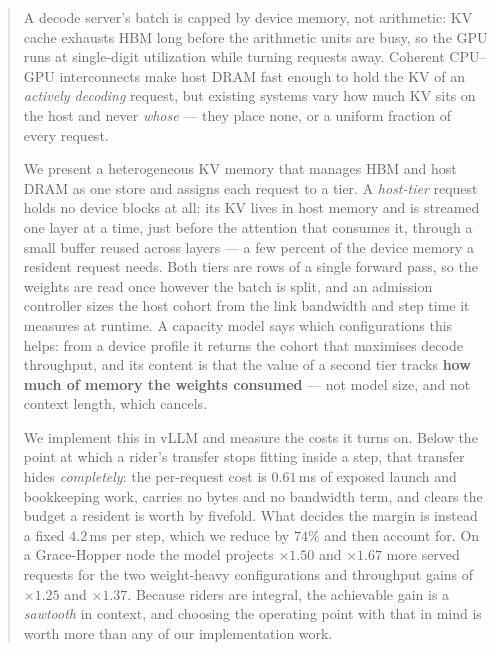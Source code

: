 \begin{abstract}
A decode server's batch is capped by device memory, not arithmetic: KV cache
exhausts HBM long before the arithmetic units are busy, so the GPU runs at
single-digit utilization while turning requests away. Coherent CPU--GPU
interconnects make host DRAM fast enough to hold the KV of an \emph{actively
decoding} request, but existing systems vary how much KV sits on the host and
never \emph{whose} --- they place none, or a uniform fraction of every request.

We present a heterogeneous KV memory that manages HBM and host DRAM as one store
and assigns each request to a tier. A \emph{host-tier} request holds no device
blocks at all: its KV lives in host memory and is streamed one layer at a time,
just before the attention that consumes it, through a small buffer reused across
layers --- a few percent of the device memory a resident request needs. Both tiers
are rows of a single forward pass, so the weights are read once however the batch
is split, and an admission controller sizes the host cohort from the link
bandwidth and step time it measures at runtime. A capacity model says which
configurations this helps: from a device profile it returns the cohort that
maximises decode throughput, and its content is that the value of a second tier
tracks \textbf{how much of memory the weights consumed} --- not model size, and
not context length, which cancels.

We implement this in vLLM and measure the costs it turns on. Below the point at
which a rider's transfer stops fitting inside a step, that transfer hides
\emph{completely}: the per-request cost is $0.61$\,ms of exposed launch and
bookkeeping work, carries no bytes and no bandwidth term, and clears the budget a
resident is worth by fivefold. What decides the margin is instead a fixed
$4.2$\,ms per step, which we reduce by $74\%$ and then account for. On a
Grace-Hopper node the model projects $\times1.50$ and $\times1.67$ more served
requests for the two weight-heavy configurations and throughput gains of
$\times1.25$ and $\times1.37$. Because riders are integral, the achievable gain is
a \emph{sawtooth} in context, and choosing the operating point with that in mind is
worth more than any of our implementation work.
\end{abstract}
